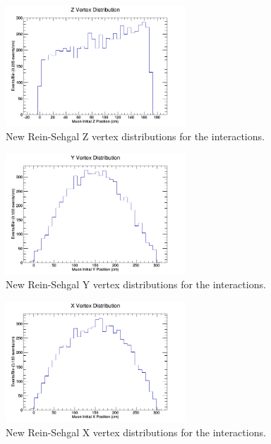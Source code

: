\documentclass[11pt]{article}
\begin{document}
\begin{figure}[H]
\centering
\includegraphics[width=0.6\textwidth]{NewNMReinSehgalImages/2-ZVertexDistributionNMRS.png}
\caption{New Rein-Sehgal Z vertex distributions for the interactions.}
\end{figure}

\begin{figure}[H]
\centering
\includegraphics[width=0.6\textwidth]{NewNMReinSehgalImages/3-YVertexDistributionNMRS.png}
\caption{New Rein-Sehgal Y vertex distributions for the interactions.}
\end{figure}

\begin{figure}[H]
\centering
\includegraphics[width=0.6\textwidth]{NewNMReinSehgalImages/4-XVertexDistributionNMRS.png}
\caption{New Rein-Sehgal X vertex distributions for the interactions.}
\end{figure}
\end{document}
